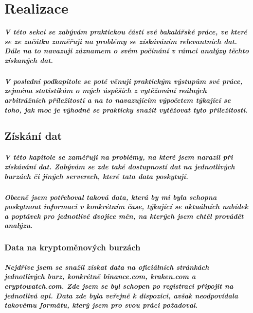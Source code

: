 \documentclass[thesis=B,czech]{FITthesis}[2019/03/21]
\begin{document}
\chapter{Realizace}
\paragraph{
V této sekci se zabývám praktickou částí své bakalářské práce, ve které se ze začátku zaměřuji na problémy se získáváním relevantních dat. Dále na to navazuji záznamem o svém počínání v rámci analýzy těchto získaných dat. 
}
\paragraph{
V poslední podkapitole se poté věnuji praktickým výstupům své práce, zejména statistikám o mých úspěších z vytěžování reálných arbitrážních příležitostí a na to navazujícím výpočetem týkající se toho, jak moc je výhodné se prakticky snažit vytěžovat tyto příležitosti.
}
\section{Získání dat}
\paragraph{
V této kapitole se zaměřuji na problémy, na které jsem narazil při získávání dat. Zabývám se zde také dostupností dat na jednotlivých burzách či jiných serverech, které tata data poskytují. 
}
\paragraph{
Obecně jsem potřeboval  taková data, která by mi byla schopna poskytnout informaci v konkrétním čase, týkající se aktuálních nabídek a poptávek pro jednotlivé dvojice měn, na kterých jsem chtěl provádět analýzu.
}
\subsection{Data na kryptoměnových burzách}
\paragraph{
Nejdříve jsem se snažil získat data na oficiálních stránkách jednotlivých burz, konkrétně binance.com, kraken.com a cryptowatch.com. Zde jsem se byl schopen po registraci připojit na jednotlivá api. Data zde byla veřejně k dispozici, avšak neodpovídala takovému formátu, který jsem pro svou práci požadoval. 
}
\end{document}
